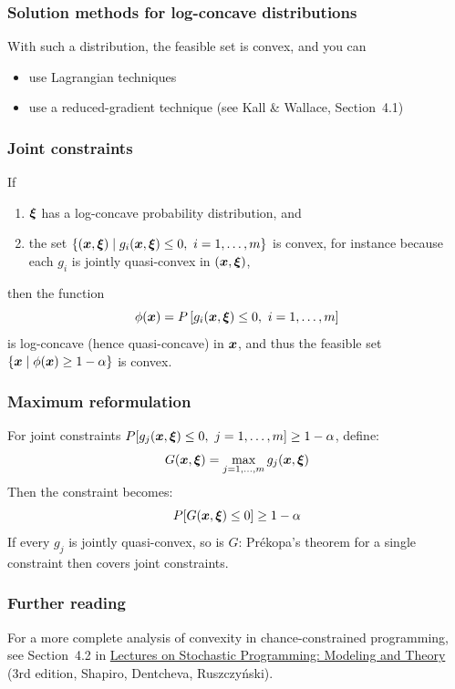 \documentclass[aspectratio=169]{beamer}
\begin{document}
\begin{frame}
\frametitle{Solution methods for log-concave distributions}

With such a distribution, the feasible set is convex, and you can
\begin{itemize}
\item
use Lagrangian techniques
\item
use a reduced-gradient technique (see Kall \& Wallace, Section~4.1)
\end{itemize}

\end{frame}

\begin{frame}
\frametitle{Joint constraints}

\begin{theorem}
	If
	\begin{enumerate}
		\item ${\boldsymbol{\xi}}$ has a log-concave probability distribution, and
		\item the set $\{({\boldsymbol{x}}, {\boldsymbol{\xi}}) \mid g_i({\boldsymbol{x}}, {\boldsymbol{\xi}}) \leq 0, \ i=1,\dots,m\}$ is convex, for instance because each $g_i$ is jointly quasi-convex in $({\boldsymbol{x}}, {\boldsymbol{\xi}})$,
	\end{enumerate}
	then the function
	\[
	\phi({\boldsymbol{x}}) = P\left[ g_i({\boldsymbol{x}}, {\boldsymbol{\xi}}) \leq 0, \ i=1,\dots,m \right]
	\]
	is log-concave (hence quasi-concave) in ${\boldsymbol{x}}$, and thus the feasible set $\{{\boldsymbol{x}} \mid \phi({\boldsymbol{x}}) \geq 1-\alpha\}$ is convex.
\end{theorem}

\end{frame}

\begin{frame}
\frametitle{Maximum reformulation}

For joint constraints $P[g_j({\boldsymbol{x}}, {\boldsymbol{\xi}}) \leq 0,\ j=1,\ldots,m] \geq 1-\alpha$, define:
\[
G({\boldsymbol{x}}, {\boldsymbol{\xi}}) = \max_{j=1,\dots,m} g_j({\boldsymbol{x}}, {\boldsymbol{\xi}})
\]
Then the constraint becomes:
\[
P[ G({\boldsymbol{x}}, {\boldsymbol{\xi}}) \leq 0 ] \geq 1-\alpha
\]
If every $g_j$ is jointly quasi-convex, so is $G$: Prékopa's theorem for a single constraint then covers joint constraints.

\end{frame}

\begin{frame}
\frametitle{Further reading}

For a more complete analysis of convexity in chance-constrained programming, see Section~4.2 in \href{https://epubs.siam.org/doi/book/10.1137/1.9781611976595}{Lectures on Stochastic Programming: Modeling and Theory} (3rd edition, Shapiro, Dentcheva, Ruszczy\'nski).

\end{frame}
\end{document}
